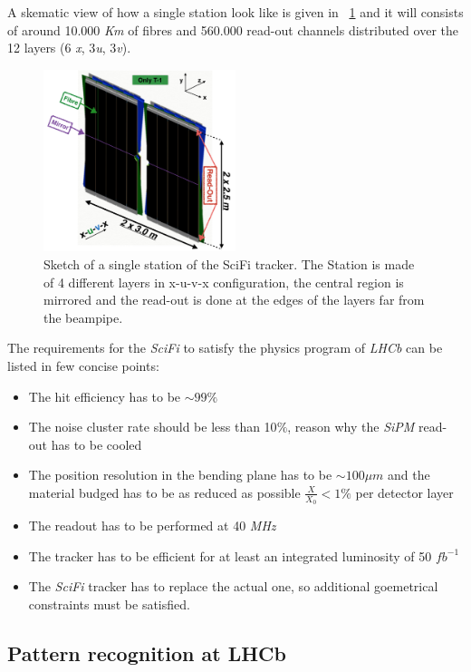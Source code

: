 \documentclass[paper=a4, fontsize=10pt]{scrartcl}
\numberwithin{equation}{section}		%
\numberwithin{figure}{section}			%
\numberwithin{table}{section}				%
\begin{document}
A skematic view of how a single station look like is given in ~\ref{Fig:SciFi} and it will consists of around 10.000 \textit{Km} of fibres and 560.000 read-out channels distributed over the 12 layers (6 \textit{x}, 3\textit{u}, 3\textit{v}).
\begin{figure}[h]
  \begin{center}
    \includegraphics[width=0.5\textwidth]{Images/ModuleSciFi.png} 
  \caption[Caption for track type]{Sketch of a single station of the SciFi tracker. The Station is made of 4 different layers in x-u-v-x configuration, the central region is mirrored and the read-out is done at the edges of the layers far from the beampipe.}\label{Fig:SciFi}
  \end{center}
\end{figure}

The requirements for the \textit{SciFi} to satisfy the physics program of \textit{LHCb} can be listed in few concise points: \begin{itemize} \item{The hit efficiency has to be $\sim 99 \%$}\item{The noise cluster rate should be less than 10$\%$, reason why the \textit{SiPM} read-out has to be cooled}\item{The position resolution in the bending plane has to be $\sim 100 \mu m$ and the material budged has to be as reduced as possible $\frac{X}{X_{0}}<1 \%$ per detector layer}\item{The readout has to be performed at 40 \textit{MHz}}\item{The tracker has to be efficient for at least an integrated luminosity of 50 $fb^{-1}$} \item{The \textit{SciFi} tracker has to replace the actual one, so additional goemetrical constraints must be satisfied.}\end{itemize}

\subsection{Pattern recognition at LHCb}
\end{document}

